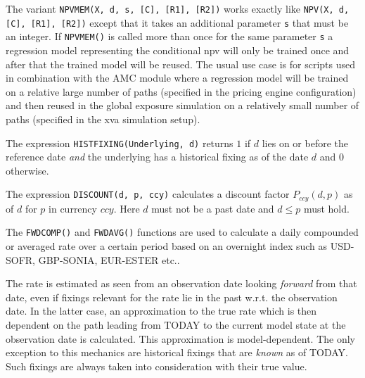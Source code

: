 The variant {\tt NPVMEM(X, d, s, [C], [R1], [R2])} works exactly like {\tt NPV(X, d, [C], [R1], [R2])} except that it
takes an additional parameter \verb+s+ that must be an integer. If \verb+NPVMEM()+ is called more than once for the same
parameter \verb+s+ a regression model representing the conditional npv will only be trained once and after that the
trained model will be reused. The usual use case is for scripts used in combination with the AMC module where a
regression model will be trained on a relative large number of paths (specified in the pricing engine configuration) and
then reused in the global exposure simulation on a relatively small number of paths (specified in the xva simulation
setup).

\label{function_histfixing}

The expression {\tt HISTFIXING(Underlying, d)} returns $1$ if $d$ lies on or before the reference date {\em and} the
underlying has a historical fixing as of the date $d$ and $0$ otherwise.

\label{function_discount}

The expression {\tt DISCOUNT(d, p, ccy)} calculates a discount factor $P_{ccy}(d,p)$ as of $d$ for $p$ in currency
$ccy$. Here $d$ must not be a past date and $d\leq p$ must hold.

\label{function_fwdcomp}

The {\tt FWDCOMP()} and {\tt FWDAVG()} functions are used to calculate a daily compounded or averaged rate over a
certain period based on an overnight index such as USD-SOFR, GBP-SONIA, EUR-ESTER etc..

The rate is estimated as seen from an observation date looking {\em forward} from that date, even if fixings relevant
for the rate lie in the past w.r.t. the observation date. In the latter case, an approximation to the true rate which is
then dependent on the path leading from TODAY to the current model state at the observation date is calculated. This
approximation is model-dependent. The only exception to this mechanics are historical fixings that are {\em known} as of
TODAY. Such fixings are always taken into consideration with their true value.


